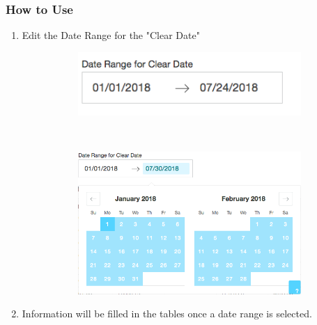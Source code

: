\documentclass[titlepage]{article}
\begin{document}
\subsubsection{How to Use}
\begin{enumerate}
	\item Edit the Date Range for the "Clear Date"
	\begin{figure}[h]
		\begin{subfigure}[b]{.5\textwidth}
			\includegraphics[scale=.5]{./pics/bank_reconcillation_dateRange_detail.png}
		\end{subfigure}
		~
		\begin{subfigure}[b]{.5\textwidth}
			\includegraphics[scale=.3]{./pics/bank_reconcillation_dateRange_dropdown_detail.png}
		\end{subfigure}
	\end{figure}
	\item Information will be filled in the tables once a date range is selected.
\end{enumerate}
\newpage
\end{document}
